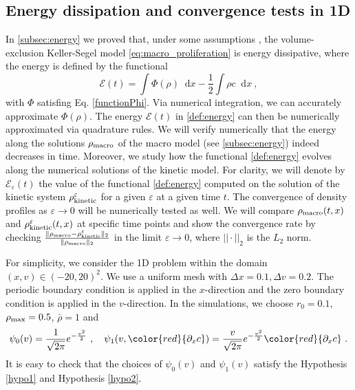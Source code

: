\documentclass[review,onefignum,onetabnum]{siamart220329}
\newcommand {\e}  {\varepsilon}
\newcommand {\p}   {\partial}
\newcommand*\diff{\mathop{}\!\mathrm{d}}
\begin{document}
\subsection{Energy dissipation and convergence tests in 1D}
In \cref{subsec:energy} we proved that, under some assumptions \cite{calvez2006volume,carrillo2001entropy,de2018energy}, the volume-exclusion Keller-Segel model \cref{eq:macro_proliferation} is energy dissipative, 
{where the energy is defined by the functional
\begin{equation}\label{def:energy}
    \mathcal{E}(t)=\int\Phi(\rho)\diff x-\frac{1}{2}\int\rho c\diff x\ ,    
\end{equation}
\noindent with $ \Phi $ satisfing Eq. \cref{functionPhi}. {Via numerical integration, we can accurately approximate $\Phi(\rho)$. The energy $\mathcal{E}(t)$ in \cref{def:energy} can then be numerically approximated via quadrature rules.} 
We will verify numerically that the energy   along the solutions $\rho_\textnormal{macro}$ of the macro model (see \cref{subsec:energy}) indeed decreases in time. 
Moreover, we study how the functional \cref{def:energy} evolves along the numerical solutions of the kinetic model. 
For clarity, we will denote by $\mathcal{E}_\e(t)$ the value of the functional \cref{def:energy} computed on the solution of the kinetic system $\rho_\textnormal{kinetic}^\e$ for a given $\e$ at a given time $t$. } 
The convergence of density profiles as $\varepsilon\to0$ will be numerically tested as well. 
We will compare $\rho_\textnormal{macro}(t,x)$ and $\rho_\textnormal{kinetic}^{\varepsilon}(t,x)$ at specific time points and show the convergence rate by checking $\frac{\|\rho_\textnormal{macro}-\rho_\textnormal{kinetic}^{\varepsilon}\|_2}{\| \rho_\textnormal{macro}\|_2}$ in the limit $\varepsilon\to0$, where $||\cdot||_2$ is the $L_2$ norm.

For simplicity, we consider the 1D problem  within the domain $(x, v) \in (-20,20)^2$. 
We use a uniform mesh with {$\Delta x = 0.1, \Delta v = 0.2$}. 
The periodic boundary condition is applied in the $x$-direction and the zero boundary condition is applied in the $v$-direction. 
In the simulations, we choose  $r_0=0.1$, $\rho_{\rm max} = 0.5$, $\bar{\rho} = 1$ and 
\begin{equation}\label{def:psi01}
    \psi_0(v) = \frac{1}{\sqrt{2\pi}}e^{-\frac{v^2}{2}}\ , \quad \psi_1(v, {\color{red}{\p_x c}}) = \frac{v}{\sqrt{2\pi}}e^{-\frac{v^2}{2}} {\color{red}{\p_x c}}\ .
\end{equation}
{It is easy to check that the choices of $\psi_0(v)$ and $\psi_1(v)$ satisfy the Hypothesis \cref{hypo1} and Hypothesis  \cref{hypo2}.}
\end{document}
